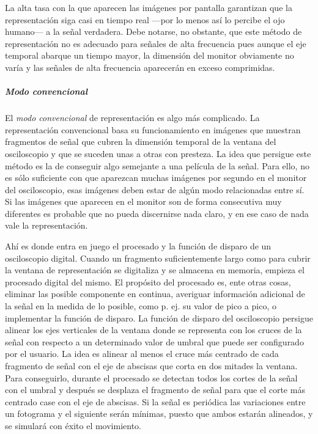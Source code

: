 La alta tasa con la que aparecen las imágenes por pantalla garantizan que la representación siga casi en tiempo real ---por lo menos así lo percibe el ojo humano--- a la señal verdadera. Debe notarse, no obstante, que este método de representación no es adecuado para señales de alta frecuencia pues aunque el eje temporal abarque un tiempo mayor, la dimensión del monitor obviamente no varía y las señales de alta frecuencia aparecerán en exceso comprimidas.\par


\subparagraph{Modo convencional}

El \emph{modo convencional} de representación es algo más complicado. La representación convencional basa su funcionamiento en imágenes que muestran fragmentos de señal que cubren la dimensión temporal de la ventana del osciloscopio y que se suceden unas a otras con presteza. La idea que persigue este método es la de conseguir algo semejante a una película de la señal. Para ello, no es sólo suficiente con que aparezcan muchas imágenes por segundo en el monitor del osciloscopio, esas imágenes deben estar de algún modo relacionadas entre sí. Si las imágenes que aparecen en el monitor son de forma consecutiva muy diferentes es probable que no pueda discernirse nada claro, y en ese caso de nada vale la representación.\par
Ahí es donde entra en juego el procesado y la función de disparo de un osciloscopio digital. Cuando un fragmento suficientemente largo como para cubrir la ventana de representación se digitaliza y se almacena en memoria, empieza el procesado digital del mismo. El propósito del procesado es, ente otras cosas, eliminar las posible componente en continua, averiguar información adicional de la señal en la medida de lo posible, como p. ej. su valor de pico a pico, o implementar la función de disparo. La función de disparo del osciloscopio persigue alinear los ejes verticales de la ventana donde se representa con los cruces de la señal con respecto a un determinado valor de umbral que puede ser configurado por el usuario. La idea es alinear al menos el cruce más centrado de cada fragmento de señal con el eje de abscisas que corta en dos mitades la ventana. Para conseguirlo, durante el procesado se detectan todos los cortes de la señal con el umbral y después se desplaza el fragmento de señal para que el corte más centrado case con el eje de abscisas. Si la señal es periódica las variaciones entre un fotograma y el siguiente serán mínimas, puesto que ambos estarán alineados, y se simulará con éxito el movimiento.\par
